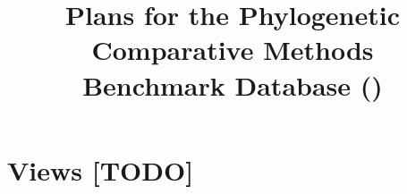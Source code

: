 \documentclass{article}
\title{Plans for the Phylogenetic Comparative Methods \\ Benchmark Database (\phycomb)}
\author{}
\begin{document}
\maketitle
\tableofcontents





\section{Views [TODO]}


\end{document}
